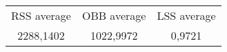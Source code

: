 \begin{tabular}{c|c|c}\\ 
RSS average & OBB average & LSS average\\ 
2288,1402 & 1022,9972 & 0,9721\\ 
\end{tabular}